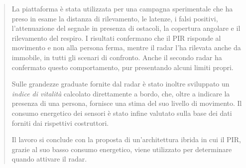 \begin{abstract}
La piattaforma è stata utilizzata per una campagna sperimentale che ha preso in
esame la distanza di rilevamento, le latenze, i falsi positivi, l'attenuazione del
segnale in presenza di ostacoli, la copertura angolare e il rilevamento del respiro.
I risultati confermano che il PIR risponde al movimento e non alla persona ferma,
mentre il radar l'ha rilevata anche da immobile, in tutti gli scenari di confronto.
Anche il secondo radar ha confermato questo comportamento, pur presentando alcuni
limiti propri.

Sulle grandezze graduate fornite dal radar è stato inoltre sviluppato un
\emph{indice di vitalità} calcolato direttamente a bordo, che, oltre a indicare la
presenza di una persona, fornisce una stima del suo livello di movimento. Il
consumo energetico dei sensori è stato infine valutato sulla base dei dati forniti
dai rispettivi costruttori.

Il lavoro si conclude con la proposta di un'architettura ibrida in cui il PIR,
grazie al suo basso consumo energetico, viene utilizzato per determinare quando
attivare il radar.

\end{abstract}
